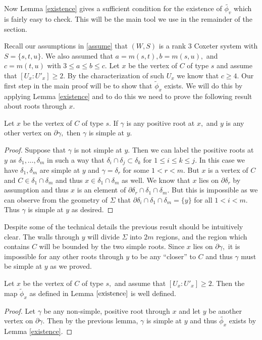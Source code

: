\documentclass[class=book, crop=false,12 pt]{standalone}
\begin{document}
Now Lemma \ref{existence} gives a sufficient condition for the existence of $\tilde{\phi_v}$ which is fairly easy to check. This will be the main tool we use in the remainder of the section. 

Recall our assumptions in \eqref{assume} that $(W,S)$ is a rank 3 Coxeter system with $S=\{s,t,u\}.$ We also assumed that $a=m(s,t),b=m(s,u),$ and $c=m(t,u)$ with $3\le a\le b \le c.$ Let $x$ be the vertex of $C$ of type $s$ and assume that $[U_x:U'_x]\ge 2.$ By the characterization of such $U_x$ we know that $c\ge 4.$ Our first step in the main proof will be to show that $\tilde{\phi}_x$ exists. We will do this by applying Lemma \ref{existence} and to do this we need to prove the following result about roots through $x.$

\begin{lemma}
\label{positiveeverywhereelse}
	Let $x$ be the vertex of $C$ of type $s.$ If $\gamma$ is any positive root at $x,$ and $y$ is any other vertex on $\partial\gamma,$ then $\gamma$ is simple at $y.$
\end{lemma}
\begin{proof} 
	Suppose that $\gamma$ is not simple at $y.$ Then we can label the positive roots at $y$ as $\delta_1,\dots,\delta_m$ in such a way that $\delta_i\cap \delta_j\subset \delta_k$ for $1\le i\le k\le j.$ In this case we have $\delta_1,\delta_m$ are simple at $y$ and $\gamma=\delta_r$ for some $1<r<m.$ But $x$ is a vertex of $C$ and $C\in \delta_1\cap \delta_m$ and thus $x\in \delta_1\cap \delta_m$ as well. We know that $x$ lies on $\partial \delta_r$ by assumption and thus $x$ is an element of $\partial \delta_r \cap \delta_1\cap \delta_m.$ But this is impossible as we can observe from the geometry of $\Sigma$ that $\partial \delta_i\cap \delta_1\cap \delta_m=\{y\}$ for all $1<i<m.$ Thus $\gamma$ is simple at $y$ as desired.
\end{proof}
Despite some of the technical details the previous result should be intuitively clear. The walls through $y$ will divide $\Sigma$ into $2m$ regions, and the region which contains $C$ will be bounded by the two simple roots. Since $x$ lies on $\partial \gamma,$ it is impossible for any other roots through $y$ to be any ``closer'' to $C$ and thus $\gamma$ must be simple at $y$ as we proved.
\begin{cor}
	Let $x$ be the vertex of $C$ of type $s,$ and assume that $[U_x:U'_x]\ge 2.$ Then the map $\tilde{\phi}_x$ as defined in Lemma $\ref{existence}$ is well defined.
\end{cor}
\begin{proof}
	Let $\gamma$ be any non-simple, positive root through $x$ and let $y$ be another vertex on $\partial \gamma.$ Then by the previous lemma, $\gamma$ is simple at $y$ and thus $\tilde{\phi_x}$ exists by Lemma \ref{existence}.
\end{proof}
\end{document}
